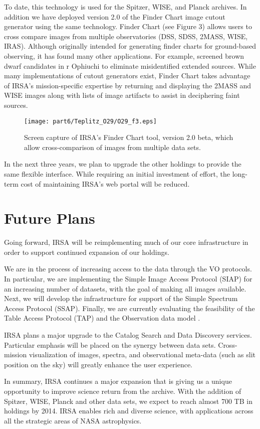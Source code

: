To date, this technology is used for the Spitzer, WISE, and Planck
archives. In addition we have deployed version 2.0 of the Finder Chart
image cutout generator using the same technology.  Finder Chart (see
Figure 3) allows users to cross compare images from multiple
observatories (DSS, SDSS, 2MASS, WISE, IRAS). Although originally
intended for generating finder charts for ground-based observing, it
has found many other applications. For example, \citet{mathews07}
screened brown dwarf candidates in r Ophiuchi to eliminate
misidentified extended sources. While many implementations of cutout
generators exist, Finder Chart takes advantage of IRSA’s
mission-specific expertise by returning and displaying the 2MASS and
WISE images along with lists of image artifacts to assist in
deciphering faint sources.

\begin{figure}[t]

\centering
\texttt{[image: part6/Teplitz\_O29/O29\_f3.eps]}
\caption{Screen capture of IRSA's Finder Chart tool, version 2.0 beta,
which allow cross-comparison of images from multiple data sets.}

\end{figure}


In the next three years, we plan to upgrade the other holdings to
provide the same flexible interface. While requiring an initial
investment of effort, the long-term cost of maintaining IRSA’s web
portal will be reduced.

\section{Future Plans}

Going forward, IRSA will be reimplementing much of our core
infrastructure in order to support continued expansion of our
holdings.  

We are in the process of increasing access to the data through the VO
protocols.  In particular, we are implementing the Simple Image Access
Protocol (SIAP) for an increasing number of datasets, with the goal of making
all images available.  Next, we will develop the infrastructure for
support of the Simple Spectrum Access Protocol (SSAP). Finally, we are
currently evaluating the feasibility of the Table Access Protocol
(TAP) and the Observation data model \citet{louys11}.

IRSA plans a major upgrade to the Catalog Search and Data
Discovery services.  Particular emphasis will be placed on the synergy
between data sets.
Cross-mission visualization of images, spectra, and observational
meta-data (such as slit position on the sky) will greatly enhance the
user experience.

In summary, IRSA continues a major expansion that is giving us a
unique opportunity to improve science return from the archive.  With
the addition of Spitzer, WISE, Planck and other data sets, we expect
to reach almost 700 TB in holdings by 2014.  IRSA enables rich and
diverse science, with applications across all the strategic areas of
NASA astrophysics.  


